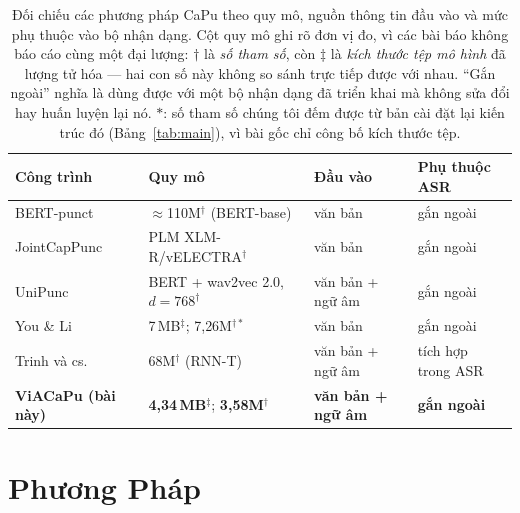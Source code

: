 \documentclass[conference,onecolumn]{IEEEtran}
\begin{document}
\begin{table}[htbp]
\caption{Đối chiếu các phương pháp CaPu theo quy mô, nguồn thông tin đầu vào và mức
phụ thuộc vào bộ nhận dạng. Cột quy mô ghi rõ đơn vị đo, vì các bài báo không báo
cáo cùng một đại lượng: $\dagger$ là \emph{số tham số}, còn $\ddagger$ là
\emph{kích thước tệp mô hình} đã lượng tử hóa --- hai con số này không so sánh trực
tiếp được với nhau. ``Gắn ngoài'' nghĩa là dùng được với một bộ nhận dạng đã triển
khai mà không sửa đổi hay huấn luyện lại nó. $*$: số tham số chúng tôi đếm được từ
bản cài đặt lại kiến trúc đó (Bảng~\ref{tab:main}), vì bài gốc chỉ công bố kích
thước tệp.}
\label{tab:position}
\centering
\setlength{\tabcolsep}{5pt}
\begin{tabular}{llll}
\toprule
Công trình & Quy mô & Đầu vào & Phụ thuộc ASR \\
\midrule
BERT-punct~\cite{bertpunct}         & $\approx$110M$^\dagger$ (BERT-base) & văn bản & gắn ngoài \\
JointCapPunc~\cite{jointcappunc}    & PLM XLM-R/vELECTRA$^\dagger$        & văn bản & gắn ngoài \\
UniPunc~\cite{unipunc}              & BERT + wav2vec 2.0, $d{=}768^\dagger$ & văn bản + ngữ âm & gắn ngoài \\
You \& Li~\cite{you2024lightweight} & 7\,MB$^\ddagger$; 7{,}26M$^{\dagger*}$ & văn bản & gắn ngoài \\
Trinh và cs.~\cite{trinh2026}       & 68M$^\dagger$ (RNN-T)               & văn bản + ngữ âm & tích hợp trong ASR \\
\midrule
\textbf{ViACaPu (bài này)}          & \textbf{4{,}34\,MB}$^\ddagger$; \textbf{3{,}58M}$^\dagger$ & \textbf{văn bản + ngữ âm} & \textbf{gắn ngoài} \\
\bottomrule
\end{tabular}
\end{table}

\section{Phương Pháp}
\label{sec:method}
\end{document}
